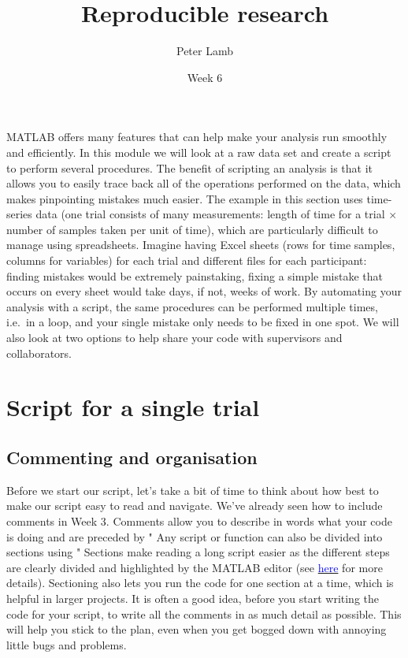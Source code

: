 \documentclass[12pt,a4paper]{article}
\title{Reproducible research}
\author{Peter Lamb}
\date{Week 6}
\begin{document}
\maketitle


MATLAB offers many features that can help make your analysis run smoothly and efficiently.
In this module we will look at a raw data set and create a script to perform several procedures.
The benefit of scripting an analysis is that it allows you to easily trace back all of the operations performed on the data, which makes pinpointing mistakes much easier.
The example in this section uses time-series data (one trial consists of many measurements: length of time for a trial $\times$ number of samples taken per unit of time), which are particularly difficult to manage using spreadsheets.
Imagine having Excel sheets (rows for time samples, columns for variables) for each trial and different files for each participant: finding mistakes would be extremely painstaking, fixing a simple mistake that occurs on every sheet would take days, if not, weeks of work.
By automating your analysis with a script, the same procedures can be performed multiple times, i.e.~in a loop, and your single mistake only needs to be fixed in one spot.
We will also look at two options to help share your code with supervisors and collaborators.

\section{Script for a single trial}
\subsection{Commenting and organisation}
Before we start our script, let's take a bit of time to think about how best to make our script easy to read and navigate.
We've already seen how to include comments in Week 3.
Comments allow you to describe in words what your code is doing and are preceded by "%
Any script or function can also be divided into sections using "%
Sections make reading a long script easier as the different steps are clearly divided and highlighted by the MATLAB editor (see \href{https://au.mathworks.com/help/matlab/matlab_prog/run-sections-of-programs.html}{\textcolor{blue}{here}} for more details).
Sectioning also lets you run the code for one section at a time, which is helpful in larger projects.
It is often a good idea, before you start writing the code for your script, to write all the comments in as much detail as possible.
This will help you stick to the plan, even when you get bogged down with annoying little bugs and problems.
\end{document}
